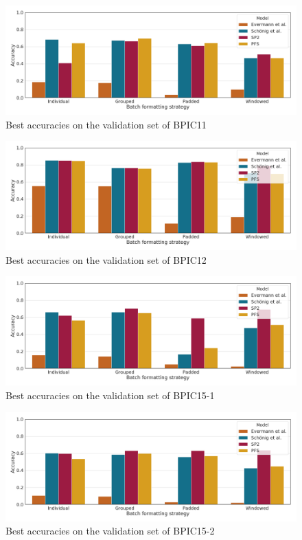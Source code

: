 \begin{figure}
    \centering
    \includegraphics[width=\textwidth]{gfx/bpic2011/accuracies.png}
    \caption{Best accuracies on the validation set of BPIC11}
    \label{fig:max-accuracies-bpic2011}
\end{figure}
\begin{figure}
    \centering
    \includegraphics[width=\textwidth]{gfx/bpic2012/accuracies.png}
    \caption{Best accuracies on the validation set of BPIC12}
    \label{fig:max-accuracies-bpic2012}
\end{figure}
\begin{figure}
    \centering
    \includegraphics[width=\textwidth]{gfx/bpic2015_1/accuracies.png}
    \caption{Best accuracies on the validation set of BPIC15-1}
    \label{fig:max-accuracies-bpic2015-1}
\end{figure}
\begin{figure}
    \centering
    \includegraphics[width=\textwidth]{gfx/bpic2015_2/accuracies.png}
    \caption{Best accuracies on the validation set of BPIC15-2}
    \label{fig:max-accuracies-bpic2015-2}
\end{figure}
